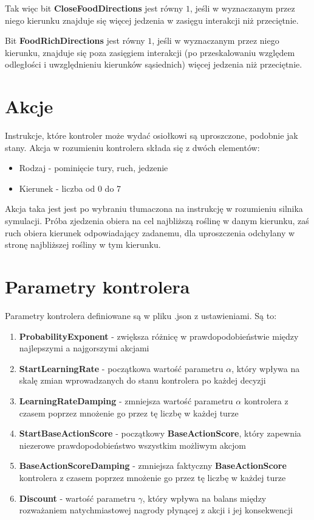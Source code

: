 Tak więc bit \textbf{CloseFoodDirections} jest równy $1$, jeśli w wyznaczanym przez niego kierunku znajduje się więcej jedzenia w zasięgu interakcji niż przeciętnie. 

Bit \textbf{FoodRichDirections} jest równy $1$, jeśli w wyznaczanym przez niego kierunku, znajduje się poza zasięgiem interakcji (po przeskalowaniu względem odległości i uwzględnieniu kierunków sąsiednich) więcej jedzenia niż przeciętnie.

\section{Akcje}
Instrukcje, które kontroler może wydać osiołkowi są uproszczone, podobnie jak stany. Akcja w rozumieniu kontrolera składa się z dwóch elementów:
\begin{itemize}
    \item Rodzaj - pominięcie tury, ruch, jedzenie
    \item Kierunek - liczba od 0 do 7
\end{itemize}
Akcja taka jest jest po wybraniu tłumaczona na instrukcję w rozumieniu silnika symulacji. Próba zjedzenia obiera na cel najbliższą roślinę w danym kierunku, zaś ruch obiera kierunek odpowiadający zadanemu, dla uproszczenia odchylany w stronę najbliższej rośliny w tym kierunku.

\section{Parametry kontrolera}
Parametry kontrolera definiowane są w pliku .json z ustawieniami. Są to:
\begin{enumerate}
    \item\textbf{ProbabilityExponent} - zwiększa różnicę w prawdopodobieństwie między najlepszymi a najgorszymi akcjami
    \item\textbf{StartLearningRate} - początkowa wartość parametru $\alpha$, który wpływa na skalę zmian wprowadzanych do stanu kontrolera po każdej decyzji
    \item\textbf{LearningRateDamping} - zmniejsza wartość parametru $\alpha$ kontrolera z czasem poprzez mnożenie go przez tę liczbę w każdej turze
    \item\textbf{StartBaseActionScore} - początkowy \textbf{BaseActionScore}, który zapewnia niezerowe prawdopodobieństwo wszystkim możliwym akcjom
    \item\textbf{BaseActionScoreDamping} - zmniejsza faktyczny \textbf{BaseActionScore} kontrolera z czasem poprzez mnożenie go przez tę liczbę w każdej turze
    \item\textbf{Discount} - wartość parametru $\gamma$, który wpływa na balans między rozważaniem natychmiastowej nagrody płynącej z akcji i jej konsekwencji
\end{enumerate}

